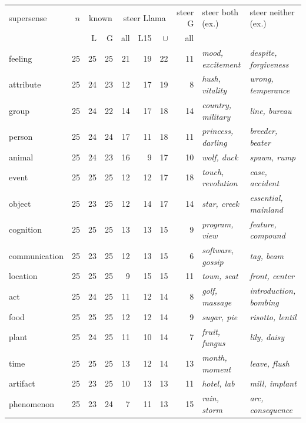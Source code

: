 \begin{table}[t]
\centering
\footnotesize
\setlength{\tabcolsep}{4.5pt}
\begin{tabular}{lrrrrrrrll}
\hline
supersense & $n$ & \multicolumn{2}{c}{known} & \multicolumn{3}{c}{steer Llama} & steer G & steer both (ex.) & steer neither (ex.) \\
 & & L & G & all & L15 & $\cup$ & all & & \\ \hline
feeling & 25 & 25 & 25 & 21 & 19 & 22 & 11 & \textit{mood, excitement} & \textit{despite, forgiveness} \\
attribute & 25 & 24 & 23 & 12 & 17 & 19 & 8 & \textit{hush, vitality} & \textit{wrong, temperance} \\
group & 25 & 24 & 22 & 14 & 17 & 18 & 14 & \textit{country, military} & \textit{line, bureau} \\
person & 25 & 24 & 24 & 17 & 11 & 18 & 11 & \textit{princess, darling} & \textit{breeder, beater} \\
animal & 25 & 24 & 23 & 16 & 9 & 17 & 10 & \textit{wolf, duck} & \textit{spawn, rump} \\
event & 25 & 25 & 25 & 12 & 12 & 17 & 18 & \textit{touch, revolution} & \textit{case, accident} \\
object & 25 & 23 & 25 & 12 & 14 & 17 & 14 & \textit{star, creek} & \textit{essential, mainland} \\
cognition & 25 & 25 & 25 & 13 & 13 & 15 & 9 & \textit{program, view} & \textit{feature, compound} \\
communication & 25 & 23 & 25 & 12 & 13 & 15 & 6 & \textit{software, gossip} & \textit{tag, beam} \\
location & 25 & 25 & 25 & 9 & 15 & 15 & 11 & \textit{town, seat} & \textit{front, center} \\
act & 25 & 24 & 25 & 11 & 12 & 14 & 8 & \textit{golf, massage} & \textit{introduction, bombing} \\
food & 25 & 25 & 25 & 12 & 12 & 14 & 9 & \textit{sugar, pie} & \textit{risotto, lentil} \\
plant & 25 & 24 & 25 & 11 & 10 & 14 & 7 & \textit{fruit, fungus} & \textit{lily, daisy} \\
time & 25 & 25 & 25 & 13 & 12 & 14 & 13 & \textit{month, moment} & \textit{leave, flush} \\
artifact & 25 & 23 & 25 & 10 & 13 & 13 & 11 & \textit{hotel, lab} & \textit{mill, implant} \\
phenomenon & 25 & 23 & 24 & 7 & 11 & 13 & 15 & \textit{rain, storm} & \textit{arc, consequence} \\

\end{tabular}
\end{table}
